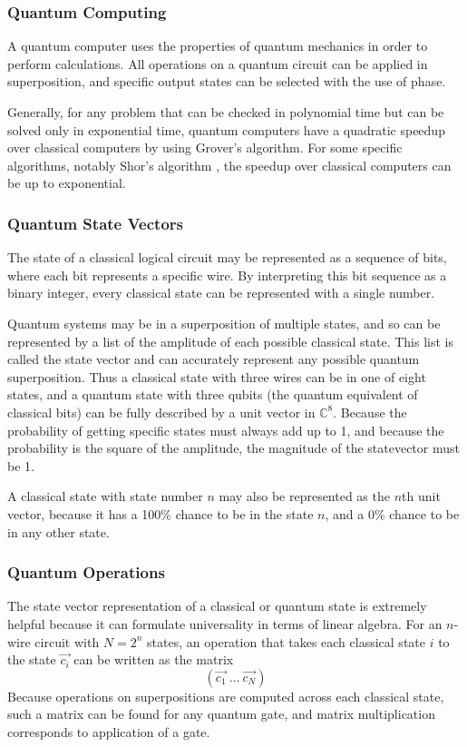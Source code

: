 \documentclass[12pt]{article}
\begin{document}
\subsubsection{Quantum Computing}
A quantum computer uses the properties of quantum mechanics in order to perform calculations. All operations on a quantum circuit can be applied in superposition, and specific output states can be selected with the use of phase.

Generally, for any problem that can be checked in polynomial time but can be solved only in exponential time, quantum computers have a quadratic speedup over classical computers by using Grover's algorithm. For some specific algorithms, notably Shor's algorithm
\cite{Shor1997}
, the speedup over classical computers can be up to exponential.

\subsubsection{Quantum State Vectors}
The state of a classical logical circuit may be represented as a sequence of bits, where each bit represents a specific wire. By interpreting this bit sequence as a binary integer, every classical state can be represented with a single number.

Quantum systems may be in a superposition of multiple states, and so can be represented by a list of the amplitude of each possible classical state. This list is called the state vector and can accurately represent any possible quantum superposition. Thus a classical state with three wires can be in one of eight states, and a quantum state with three qubits (the quantum equivalent of classical bits) can be fully described by a unit vector in $\mathbb{C}^8$. Because the probability of getting specific states must always add up to 1, and because the probability is the square of the amplitude, the magnitude of the statevector must be 1.

A classical state with state number $n$ may also be represented as the $n$th unit vector, because it has a 100\% chance to be in the state $n$, and a 0\% chance to be in any other state.

\subsubsection{Quantum Operations}
The state vector representation of a classical or quantum state is extremely helpful because it can formulate universality in terms of linear algebra. For an $n$-wire circuit with $N=2^n$ states, an operation that takes each classical state $i$ to the state $\vec{c_{i}}$ can be written as the matrix
$$
(\vec{c_{1}} \: \dots \: \vec{c_{N}})
$$
Because operations on superpositions are computed across each classical state, such a matrix can be found for any quantum gate, and matrix multiplication corresponds to application of a gate.
\end{document}
